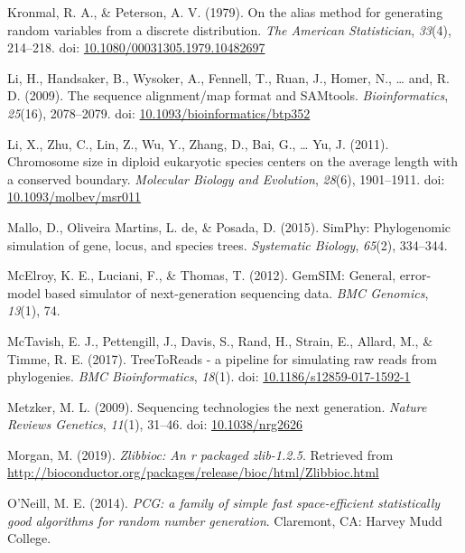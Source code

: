 \documentclass[12pt,]{article}
\begin{document}
\leavevmode\hypertarget{ref-Kronmal_1979}{}%
Kronmal, R. A., \& Peterson, A. V. (1979). On the alias method for generating random variables from a discrete distribution. \emph{The American Statistician}, \emph{33}(4), 214--218. doi: \href{https://doi.org/10.1080/00031305.1979.10482697}{10.1080/00031305.1979.10482697}

\leavevmode\hypertarget{ref-Li_2009}{}%
Li, H., Handsaker, B., Wysoker, A., Fennell, T., Ruan, J., Homer, N., \ldots{} and, R. D. (2009). The sequence alignment/map format and SAMtools. \emph{Bioinformatics}, \emph{25}(16), 2078--2079. doi: \href{https://doi.org/10.1093/bioinformatics/btp352}{10.1093/bioinformatics/btp352}

\leavevmode\hypertarget{ref-Li_2011}{}%
Li, X., Zhu, C., Lin, Z., Wu, Y., Zhang, D., Bai, G., \ldots{} Yu, J. (2011). Chromosome size in diploid eukaryotic species centers on the average length with a conserved boundary. \emph{Molecular Biology and Evolution}, \emph{28}(6), 1901--1911. doi: \href{https://doi.org/10.1093/molbev/msr011}{10.1093/molbev/msr011}

\leavevmode\hypertarget{ref-Mallo_2015}{}%
Mallo, D., Oliveira Martins, L. de, \& Posada, D. (2015). SimPhy: Phylogenomic simulation of gene, locus, and species trees. \emph{Systematic Biology}, \emph{65}(2), 334--344.

\leavevmode\hypertarget{ref-McElroy_2012}{}%
McElroy, K. E., Luciani, F., \& Thomas, T. (2012). GemSIM: General, error-model based simulator of next-generation sequencing data. \emph{BMC Genomics}, \emph{13}(1), 74.

\leavevmode\hypertarget{ref-McTavish_2017}{}%
McTavish, E. J., Pettengill, J., Davis, S., Rand, H., Strain, E., Allard, M., \& Timme, R. E. (2017). TreeToReads - a pipeline for simulating raw reads from phylogenies. \emph{BMC Bioinformatics}, \emph{18}(1). doi: \href{https://doi.org/10.1186/s12859-017-1592-1}{10.1186/s12859-017-1592-1}

\leavevmode\hypertarget{ref-Metzker_2009}{}%
Metzker, M. L. (2009). Sequencing technologies the next generation. \emph{Nature Reviews Genetics}, \emph{11}(1), 31--46. doi: \href{https://doi.org/10.1038/nrg2626}{10.1038/nrg2626}

\leavevmode\hypertarget{ref-Morgan_2019}{}%
Morgan, M. (2019). \emph{Zlibbioc: An r packaged zlib-1.2.5}. Retrieved from \url{http://bioconductor.org/packages/release/bioc/html/Zlibbioc.html}

\leavevmode\hypertarget{ref-Oneill_2014pcg}{}%
O'Neill, M. E. (2014). \emph{PCG: a family of simple fast space-efficient statistically good algorithms for random number generation}. Claremont, CA: Harvey Mudd College.
\end{document}

